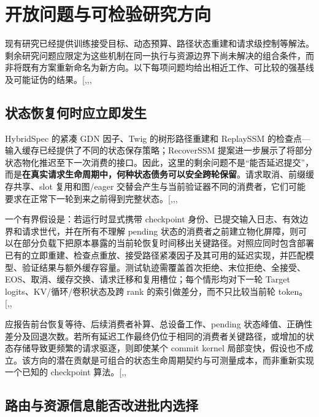 \documentclass[
  a4paper,
  UTF8,
  fontset=none,
  zihao=5]{ctexart}
\begin{document}
\section{开放问题与可检验研究方向}\label{directions}

现有研究已经提供训练接受目标、动态预算、路径状态重建和请求级控制等解法。剩余研究问题应限定为这些机制在同一执行与资源边界下尚未解决的组合条件，而非将既有方案重新命名为新方向。以下每项问题均给出相近工作、可比较的强基线及可能证伪的结果。{[},,,\citeproc{ref-realloss}{35}{]}

\subsection{状态恢复何时应立即发生}\label{deferred-commit}

HybridSpec 的紧凑 GDN 因子、Twig 的树形路径重建和 ReplaySSM
的检查点---输入缓存已经提供了不同的状态保存策略；RecoverSSM
提案进一步展示了将部分状态物化推迟至下一次消费的接口。因此，这里的剩余问题不是``能否延迟提交''，而是\textbf{在真实请求生命周期中，何种状态债务可以安全跨轮保留}。请求取消、前缀缓存共享、slot
复用和图/eager
交替会产生与当前验证器不同的消费者，它们可能要求在正常下一轮到来之前得到完整状态。{[},,,\citeproc{ref-pr-recover}{30}{]}

一个有界假设是：若运行时显式携带 checkpoint
身份、已提交输入日志、有效边界和请求世代，并在所有不理解 pending
状态的消费者之前建立物化屏障，则可以在部分负载下把原本暴露的当前轮恢复时间移出关键路径。对照应同时包含部署已有的立即重建、检查点重放、接受路径紧凑因子及其可用的延迟实现，并匹配模型、验证结果与额外缓存容量。测试轨迹需覆盖首次拒绝、末位拒绝、全接受、EOS、取消、缓存交换、请求迁移和复用槽位；每个情形均对下一轮
Target logits、KV/循环/卷积状态及跨 rank 的索引做差分，而不只比较当前轮
token。{[},,\citeproc{ref-pr-recover}{30}{]}

应报告前台恢复等待、后续消费者补算、总设备工作、pending
状态峰值、正确性差分及回退次数。若所有延迟工作最终仍位于相同的消费者关键路径，或增加的状态存储导致更频繁的请求驱逐，则即使某个
commit kernel
局部变快，假设也不成立。该方向的潜在贡献是可组合的状态生命周期契约与可测量成本，而非重新实现一个已知的
checkpoint
算法。{[},,\citeproc{ref-pr-d2h}{31}{]}

\subsection{路由与资源信息能否改进批内选择}\label{routing-aware-scheduling}
\end{document}
